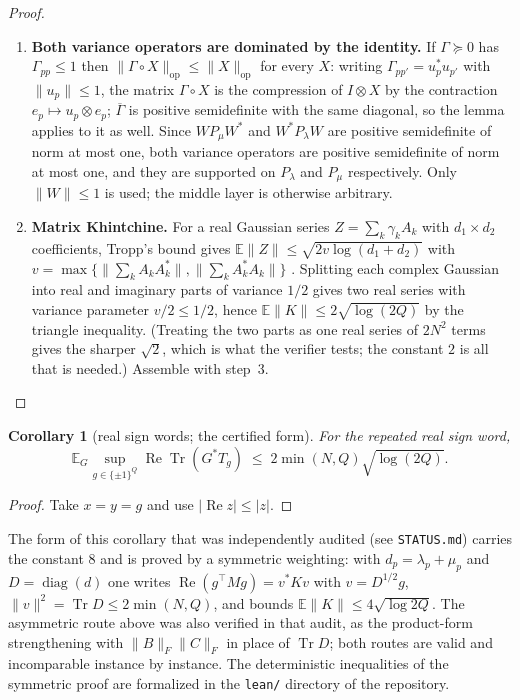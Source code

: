 \documentclass[11pt,a4paper]{article}
\theoremstyle{plain}
\newtheorem{corollary}[theorem]{Corollary}
\theoremstyle{definition}
\theoremstyle{remark}
\DeclareMathOperator{\Tr}{Tr}
\DeclareMathOperator{\diag}{diag}
\DeclareMathOperator{\op}{op}
\newcommand{\E}{\mathbb E}
\newcommand{\Fro}[1]{\|#1\|_F}
\begin{document}
\begin{proof}
\begin{enumerate}[leftmargin=*]
\item \textbf{Both variance operators are dominated by the identity.} If $\Gamma\succeq0$ has
$\Gamma_{pp}\le1$ then $\|\Gamma\circ X\|_{\op}\le\|X\|_{\op}$ for every $X$: writing
$\Gamma_{pp'}=u_p^{*}u_{p'}$ with $\|u_p\|\le1$, the matrix $\Gamma\circ X$ is the compression
of $I\otimes X$ by the contraction $e_p\mapsto u_p\otimes e_p$; $\overline{\Gamma}$ is positive
semidefinite with the same diagonal, so the lemma applies to it as well. Since $WP_\mu W^{*}$
and $W^{*}P_\lambda W$ are positive semidefinite of norm at most one, both variance operators
are positive semidefinite of norm at most one, and they are supported on $P_\lambda$ and
$P_\mu$ respectively. Only $\|W\|\le1$ is used; the middle layer is otherwise arbitrary.

\item \textbf{Matrix Khintchine.} For a real Gaussian series $Z=\sum_k\gamma_kA_k$ with
$d_1\times d_2$ coefficients, Tropp's bound gives $\E\|Z\|\le\sqrt{2v\log(d_1+d_2)}$ with
$v=\max\{\|\sum_kA_kA_k^{*}\|,\|\sum_kA_k^{*}A_k\|\}$ \cite[Thm~4.1.1]{Tro15}. Splitting each
complex Gaussian into real and imaginary parts of variance $1/2$ gives two real series with
variance parameter $v/2\le1/2$, hence $\E\|K\|\le2\sqrt{\log(2Q)}$ by the triangle
inequality. (Treating the two parts as one real series of $2N^2$ terms gives the sharper
$\sqrt2$, which is what the verifier tests; the constant $2$ is all that is needed.) Assemble
with step~3.
\end{enumerate}
\end{proof}

\begin{corollary}[real sign words; the certified form]\label{cor:real}
For the repeated real sign word,
\[
\E_G\sup_{g\in\{\pm1\}^Q}\operatorname{Re}\Tr(G^{*}T_g)\;\le\;2\min(N,Q)\sqrt{\log(2Q)}.
\]
\end{corollary}

\begin{proof}
Take $x=y=g$ and use $|\operatorname{Re}z|\le|z|$.
\end{proof}

The form of this corollary that was independently audited (see \texttt{STATUS.md}) carries
the constant $8$ and is proved by a symmetric weighting: with $d_p=\lambda_p+\mu_p$ and
$D=\diag(d)$ one writes $\operatorname{Re}(g^{\top}Mg)=v^{*}Kv$ with $v=D^{1/2}g$,
$\|v\|^2=\Tr D\le2\min(N,Q)$, and bounds $\E\|K\|\le4\sqrt{\log2Q}$. The asymmetric route
above was also verified in that audit, as the product-form strengthening with
$\Fro{B}\Fro{C}$ in place of $\Tr D$; both routes are valid and incomparable instance by
instance. The deterministic inequalities of the symmetric proof
are formalized in the \texttt{lean/} directory of the repository.
\end{document}
